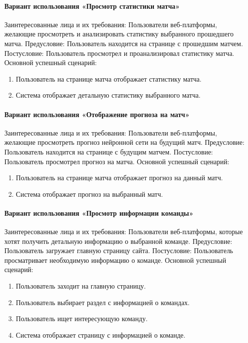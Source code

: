 \paragraph{Вариант использования «Просмотр статистики матча»}
Заинтересованные лица и их требования: Пользователи веб-платформы, желающие просмотреть и анализировать статистику выбранного прошедшего матча.
Предусловие: Пользователь находится на странице с прошедшим матчем.
Постусловие: Пользователь просмотрел и проанализировал статистику матча.
Основной успешный сценарий:
\begin{enumerate}
	\item Пользователь на странице матча отображает статистику матча.
	\item Система отображает детальную статистику выбранного матча.
\end{enumerate}

\paragraph{Вариант использования «Отображение прогноза на матч»}
Заинтересованные лица и их требования: Пользователи веб-платформы, желающие просмотреть прогноз нейронной сети на будущий матч.
Предусловие: Пользователь находится на странице с будущим матчем.
Постусловие: Пользователь просмотрел прогноз на матча.
Основной успешный сценарий:
\begin{enumerate}
	\item Пользователь на странице матча отображает прогноз на данный матч.
	\item Система отображает прогноз на выбранный матч.
\end{enumerate}

\paragraph{Вариант использования «Просмотр информации команды»}
Заинтересованные лица и их требования: Пользователи веб-платформы, которые хотят получить детальную информацию о выбранной команде.
Предусловие: Пользователь загружает главную страницу сайта.
Постусловие: Пользователь просматривает необходимую информацию о команде.
Основной успешный сценарий:
\begin{enumerate}
	\item Пользователь заходит на главную страницу.
	\item Пользователь выбирает раздел с информацией о командах.
	\item Пользователь ищет интересующую команду.
	\item Система отображает страницу с информацией о команде.
\end{enumerate}

